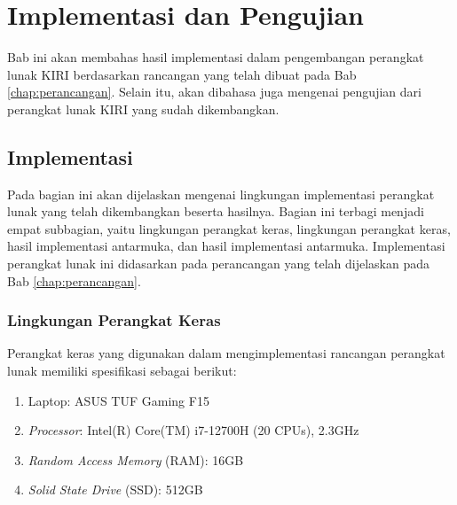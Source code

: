 \chapter{Implementasi dan Pengujian}
\label{chap:implementasidanpengujian}
Bab ini akan membahas hasil implementasi dalam pengembangan perangkat lunak KIRI berdasarkan rancangan yang telah dibuat pada Bab \ref{chap:perancangan}. Selain itu, akan dibahasa juga mengenai pengujian dari perangkat lunak KIRI yang sudah dikembangkan.
\section{Implementasi}
\label{sec:implementasi}
Pada bagian ini akan dijelaskan mengenai lingkungan implementasi perangkat lunak yang telah dikembangkan beserta hasilnya. Bagian ini terbagi menjadi empat subbagian, yaitu lingkungan perangkat keras, lingkungan perangkat keras, hasil implementasi antarmuka, dan hasil implementasi antarmuka. Implementasi perangkat lunak ini didasarkan pada perancangan yang telah dijelaskan pada Bab \ref{chap:perancangan}.

\subsection{Lingkungan Perangkat Keras}
\label{subsec:lingkunganperangkatkeras}
Perangkat keras yang digunakan dalam mengimplementasi rancangan perangkat lunak memiliki spesifikasi sebagai berikut:
\begin{enumerate}
    \item Laptop: ASUS TUF Gaming F15
    \item \textit{Processor}: Intel(R) Core(TM) i7-12700H (20 CPUs), 2.3GHz
    \item \textit{Random Access Memory} (RAM): 16GB
    \item \textit{Solid State Drive} (SSD): 512GB
\end{enumerate}

